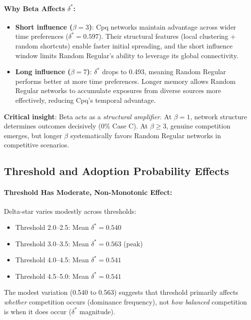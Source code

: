 \documentclass[12pt,a4paper]{article}
\begin{document}
\paragraph{Why Beta Affects $\delta^*$:}

\begin{itemize}
    \item \textbf{Short influence ($\beta=3$)}: Cpq networks maintain advantage across wider time preferences ($\delta^* = 0.597$). Their structural features (local clustering + random shortcuts) enable faster initial spreading, and the short influence window limits Random Regular's ability to leverage its global connectivity.

    \item \textbf{Long influence ($\beta=7$)}: $\delta^*$ drops to 0.493, meaning Random Regular performs better at more time preferences. Longer memory allows Random Regular networks to accumulate exposures from diverse sources more effectively, reducing Cpq's temporal advantage.
\end{itemize}

\textbf{Critical insight}: Beta acts as a \textit{structural amplifier}. At $\beta=1$, network structure determines outcomes decisively (0\% Case C). At $\beta \geq 3$, genuine competition emerges, but longer $\beta$ systematically favors Random Regular networks in competitive scenarios.

\subsection{Threshold and Adoption Probability Effects}

\paragraph{Threshold Has Moderate, Non-Monotonic Effect:}

Delta-star varies modestly across thresholds:
\begin{itemize}
    \item Threshold 2.0--2.5: Mean $\delta^* = 0.540$
    \item Threshold 3.0--3.5: Mean $\delta^* = 0.563$ (peak)
    \item Threshold 4.0--4.5: Mean $\delta^* = 0.541$
    \item Threshold 4.5--5.0: Mean $\delta^* = 0.541$
\end{itemize}

The modest variation (0.540 to 0.563) suggests that threshold primarily affects \textit{whether} competition occurs (dominance frequency), not \textit{how balanced} competition is when it does occur ($\delta^*$ magnitude).
\end{document}
